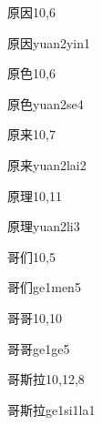 \begin{entry}{原因}{10,6}
  \begin{phonetics}{原因}{yuan2yin1}
  \end{phonetics}
\end{entry}

\begin{entry}{原色}{10,6}
  \begin{phonetics}{原色}{yuan2se4}
  \end{phonetics}
\end{entry}

\begin{entry}{原来}{10,7}
  \begin{phonetics}{原来}{yuan2lai2}
  \end{phonetics}
\end{entry}

\begin{entry}{原理}{10,11}
  \begin{phonetics}{原理}{yuan2li3}
  \end{phonetics}
\end{entry}

\begin{entry}{哥们}{10,5}
  \begin{phonetics}{哥们}{ge1men5}
  \end{phonetics}
\end{entry}

\begin{entry}{哥哥}{10,10}
  \begin{phonetics}{哥哥}{ge1ge5}
  \end{phonetics}
\end{entry}

\begin{entry}{哥斯拉}{10,12,8}
  \begin{phonetics}{哥斯拉}{ge1si1la1}
  \end{phonetics}
\end{entry}

